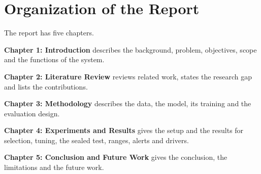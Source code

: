 \section{Organization of the Report}
The report has five chapters.

\textbf{Chapter 1: Introduction} describes the background, problem, objectives, scope and the functions of the system.

\textbf{Chapter 2: Literature Review} reviews related work, states the research gap and lists the contributions.

\textbf{Chapter 3: Methodology} describes the data, the model, its training and the evaluation design.

\textbf{Chapter 4: Experiments and Results} gives the setup and the results for selection, tuning, the sealed test, ranges, alerts and drivers.

\textbf{Chapter 5: Conclusion and Future Work} gives the conclusion, the limitations and the future work.
